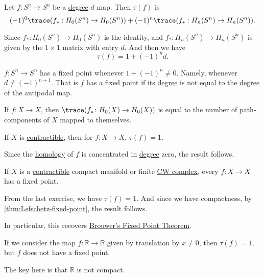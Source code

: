 \begin{eg}
	Let \(f \colon S^n \to S^n\) be a \hyperref[def:degree]{degree} \(d\) map. Then \(\tau(f)\) is
	\[
		(-1)^0\trace(f_\ast : H_0(S^n) \to H_0(S^n)) + (-1)^n\trace(f_\ast : H_n(S^n) \to H_n(S^n)).
	\]

	Since \(f_\ast \colon H_0(S^n) \to H_0(S^n)\) is the identity, and \(f_\ast \colon H_n(S^n) \to H_n(S^n)\) is given by the
	\(1 \times 1\) matrix with entry \(d\). And then we have
	\[
		\tau(f) = 1 + (-1)^n d.
	\]
\end{eg}

\begin{corollary}
	\(f\colon S^n \to S^n\) has a fixed point whenever \(1 + (-1)^n \neq 0\). Namely, whenever \(d \neq (-1)^{n + 1}\). That is \(f\) has a fixed point if its
	\hyperref[def:degree]{degree} is not equal to the \hyperref[def:degree]{degree} of the antipodal map.
\end{corollary}

\begin{exercise}
	If \(f \colon X \to X\), then \(\trace(f_\ast \colon H_0(X) \to H_0(X))\) is equal to the number of \hyperref[def:path]{path}-components of \(X\) mapped
	to themselves.
\end{exercise}

\begin{exercise}
	If \(X\) is \hyperref[def:contractible]{contractible}, then for \(f\colon X\to X\), \(\tau(f) = 1\).
\end{exercise}
\begin{answer}
	Since the \hyperref[def:homology-group]{homology} of \(f\) is concentrated in \hyperref[def:degree]{degree} zero, the result follows.
\end{answer}

\begin{exercise}
	If \(X\) is a \hyperref[def:contractible]{contractible} compact manifold or finite \hyperref[def:CW-Complex]{CW complex}, every \(f\colon X\to X\)
	has a fixed point.
\end{exercise}
\begin{answer}
	From the last exercise, we have \(\tau (f) = 1\). And since we have compactness, by \autoref{thm:Lefschetz-fixed-point},
	the result follows.
	\begin{remark}
		In particular, this recovers \hyperref[thm:Brouwer-fixed-point]{Brouwer's Fixed Point Theorem}.
	\end{remark}
\end{answer}
\begin{eg}
	If we consider the map \(f \colon \mathbb{R} \to \mathbb{R}\) given by translation by \(x \neq 0\), then \(\tau(f) = 1\), but \(f\) does not have a fixed point.
\end{eg}
\begin{explanation}
	The key here is that \(\mathbb{R}\) is not compact.
\end{explanation}


